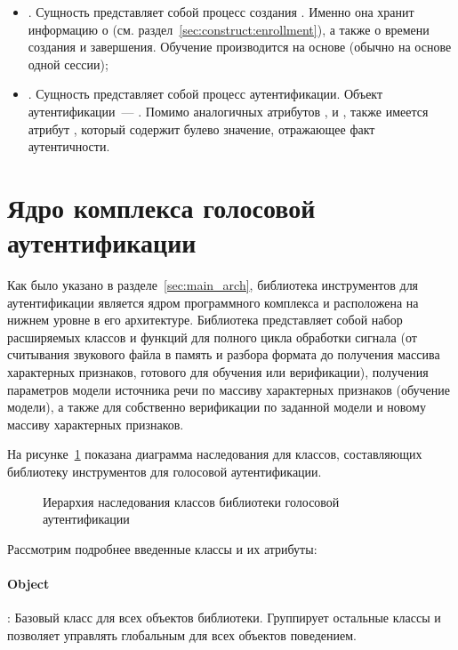 \begin{itemize}
\item {}. Сущность представляет собой процесс создания . Именно она хранит информацию о  (см. раздел~\ref{sec:construct:enrollment}), а также о времени создания и завершения. Обучение производится на основе  (обычно на основе одной сессии);
\item {}. Сущность представляет собой процесс аутентификации. Объект аутентификации~--- . Помимо аналогичных атрибутов ,  и , также имеется атрибут , который содержит булево значение, отражающее факт аутентичности.
\end{itemize}


\section{Ядро комплекса голосовой аутентификации}

Как было указано в разделе~\ref{sec:main_arch}, библиотека инструментов для аутентификации является ядром программного комплекса и расположена на нижнем уровне в его архитектуре. Библиотека представляет собой набор расширяемых классов и функций для полного цикла обработки сигнала (от считывания звукового файла в память и разбора формата до получения массива характерных признаков, готового для обучения или верификации), получения параметров модели источника речи по массиву характерных признаков (обучение модели), а также для собственно верификации по заданной модели и новому массиву характерных признаков.

На рисунке~\ref{fig:inheritance_verispeak} показана диаграмма наследования для классов, составляющих библиотеку инструментов для голосовой аутентификации.

\begin{figure}[ht]
\center{\scalebox{1.0}{}}
\label{fig:inheritance_verispeak}
\caption{Иерархия наследования классов библиотеки голосовой аутентификации}
\end{figure}

Рассмотрим подробнее введенные классы и их атрибуты:

\paragraph{Object}: Базовый класс для всех объектов библиотеки. Группирует остальные классы и позволяет управлять глобальным для всех объектов поведением.

